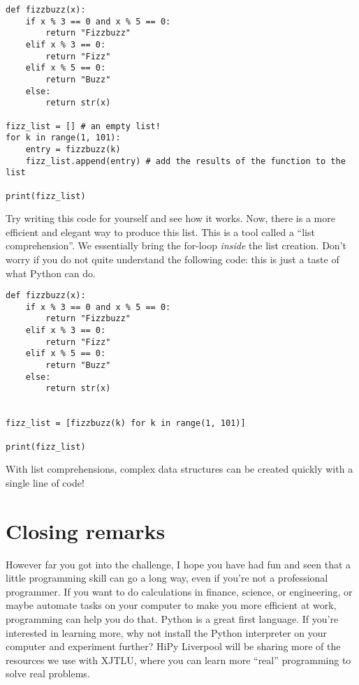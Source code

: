 \documentclass[a4paper]{article}
\begin{document}
\begin{lstlisting}
def fizzbuzz(x):
    if x % 3 == 0 and x % 5 == 0:
        return "Fizzbuzz"
    elif x % 3 == 0:
        return "Fizz"
    elif x % 5 == 0:
        return "Buzz"
    else:
        return str(x)

fizz_list = [] # an empty list!
for k in range(1, 101):
    entry = fizzbuzz(k)
    fizz_list.append(entry) # add the results of the function to the list

print(fizz_list)
\end{lstlisting}
Try writing this code for yourself and see how it works. Now, there is a more efficient and elegant way to produce this list. This is a tool called a ``list comprehension''. We essentially bring the for-loop \emph{inside} the list creation. Don't worry if you do not quite understand the following code: this is just a taste of what Python can do.
\begin{lstlisting}
def fizzbuzz(x):
    if x % 3 == 0 and x % 5 == 0:
        return "Fizzbuzz"
    elif x % 3 == 0:
        return "Fizz"
    elif x % 5 == 0:
        return "Buzz"
    else:
        return str(x)


fizz_list = [fizzbuzz(k) for k in range(1, 101)]

print(fizz_list)
\end{lstlisting}
With list comprehensions, complex data structures can be created quickly with a single line of code!

\section{Closing remarks}

However far you got into the challenge, I hope you have had fun and seen that a little programming skill can go a long way, even if you're not a professional programmer. If you want to do calculations in finance, science, or engineering, or maybe automate tasks on your computer to make you more efficient at work, programming can help you do that. Python is a great first language. If you're interested in learning more, why not install the Python interpreter on your computer and experiment further? HiPy Liverpool will be sharing more of the resources we use with XJTLU, where you can learn more ``real'' programming to solve real problems.
\end{document}

